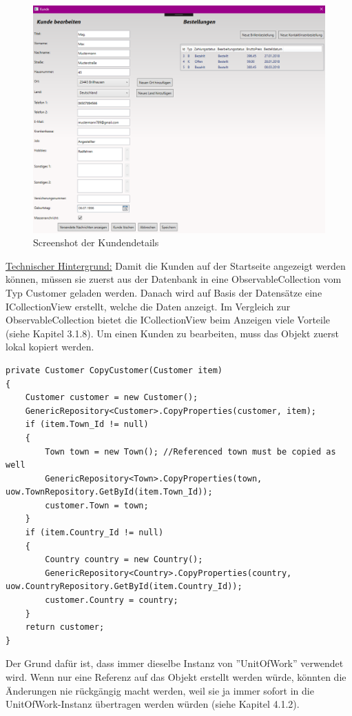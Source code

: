 \begin{figure}[H]
\begin{center}
	\includegraphics[scale=.5]{images/KundenDetails.png}
\end{center}
	\caption{Screenshot der Kundendetails}
	\label{fig:sample}
\end{figure}
\noindent \underline{Technischer Hintergrund:}
Damit die Kunden auf der Startseite angezeigt werden können, müssen sie zuerst aus der Datenbank in eine ObservableCollection vom Typ Customer geladen werden. 
Danach wird auf Basis der Datensätze eine ICollectionView erstellt, welche die Daten anzeigt. Im Vergleich zur ObservableCollection bietet die ICollectionView beim Anzeigen viele Vorteile (siehe Kapitel 3.1.8). 
Um einen Kunden zu bearbeiten, muss das Objekt zuerst lokal kopiert werden.
\begin{lstlisting}
private Customer CopyCustomer(Customer item)
{
	Customer customer = new Customer();
	GenericRepository<Customer>.CopyProperties(customer, item);
	if (item.Town_Id != null)
	{
		Town town = new Town(); //Referenced town must be copied as well
		GenericRepository<Town>.CopyProperties(town, 	uow.TownRepository.GetById(item.Town_Id));
		customer.Town = town;
	}
	if (item.Country_Id != null)
	{
		Country country = new Country();
		GenericRepository<Country>.CopyProperties(country, uow.CountryRepository.GetById(item.Country_Id));
		customer.Country = country;
	}
	return customer;
}
\end{lstlisting}
Der Grund dafür ist, dass immer dieselbe Instanz von ''UnitOfWork'' verwendet wird. Wenn nur eine Referenz auf das Objekt erstellt werden würde, könnten die Änderungen nie rückgängig macht werden, weil sie ja immer sofort in die UnitOfWork-Instanz \newline übertragen werden würden (siehe Kapitel 4.1.2).
